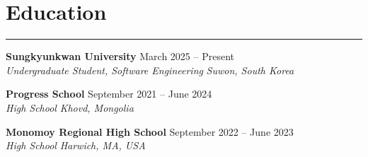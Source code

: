 \documentclass[letterpaper, 10pt]{article}
\begin{document}
\section*{Education}
\hrule
\vspace{4pt}

\textbf{Sungkyunkwan University} \hfill March 2025 -- Present \\
\textit{Undergraduate Student, Software Engineering}
\hfill \textit{Suwon, South Korea}

\vspace{5pt}

\textbf{Progress School} \hfill September 2021 -- June 2024 \\
\textit{High School} \hfill \textit{Khovd, Mongolia}

\vspace{5pt}

\textbf{Monomoy Regional High School}
\hfill September 2022 -- June 2023 \\
\textit{High School} \hfill \textit{Harwich, MA, USA}
\end{document}
